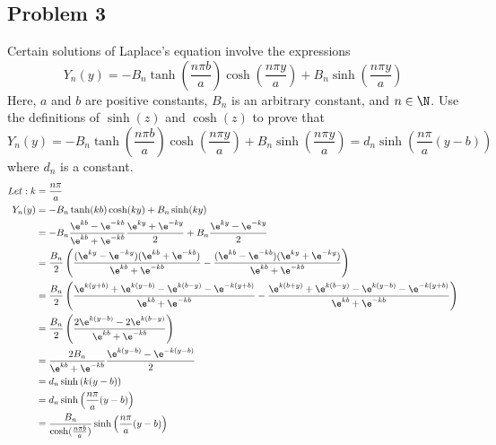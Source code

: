 \documentclass{math}
\begin{document}
\subsection*{Problem 3}
Certain solutions of Laplace's equation involve the expressions
\[ Y_n(y) = -B_n\tanh(\frac{n\pi b}{a})\cosh(\frac{n\pi y}{a})+
  B_n\sinh(\frac{n\pi y}{a}) \]
Here, \( a \) and \( b \) are positive constants, \( B_n \) is an arbitrary
constant, and \( n\in\N \). Use the definitions of \( \sinh(z) \) and
\( \cosh(z) \) to prove that
\[ Y_n(y) = -B_n\tanh(\frac{n\pi b}{a})\cosh(\frac{n\pi y}{a})+
  B_n\sinh(\frac{n\pi y}{a}) = d_n\sinh(\frac{n\pi}{a}(y-b)) \]
where \( d_n \) is a constant.
\begin{align*}
  Let: k &= \frac{n\pi}{a} \\
  Y_n(y) &= -B_n\tanh(kb)\cosh(ky)+B_n\sinh(ky) \\
  &= -B_n\frac{\e^{kb}-\e^{-kb}}{\e^{kb}+\e^{-kb}}\frac{\e^{ky}+\e^{-ky}}{2}+
    B_n\frac{\e^{ky}-\e^{-ky}}{2} \\
  &= \frac{B_n}{2}\left(
    \frac{(\e^{ky}-\e^{-ky})(\e^{kb}+\e^{-kb})}{\e^{kb}+\e^{-kb}}-
    \frac{(\e^{kb}-\e^{-kb})(\e^{ky}+\e^{-ky})}{\e^{kb}+\e^{-kb}}
    \right) \\
  &= \frac{B_n}{2}\left(
    \frac{\e^{k(y+b)}+\e^{k(y-b)}-\e^{k(b-y)}-\e^{-k(y+b)}}{\e^{kb}+\e^{-kb}}-
    \frac{\e^{k(b+y)}+\e^{k(b-y)}-\e^{k(y-b)}-\e^{-k(y+b)}}{\e^{kb}+\e^{-kb}}
  \right) \\
  &= \frac{B_n}{2}\left(
    \frac{2\e^{k(y-b)}-2\e^{k(b-y)}}{\e^{kb}+\e^{-kb}}
  \right) \\
  &= \frac{2B_n}{\e^{kb}+\e^{-kb}}\frac{\e^{k(y-b)}-\e^{-k(y-b)}}{2} \\
  &= d_n\sinh\left(k(y-b)\right) \\
  &= d_n\sinh\left(\frac{n\pi}{a}(y-b)\right) \\
  &= \frac{B_n}{\cosh(\frac{n\pi b}{a})}\sinh\left(\frac{n\pi}{a}(y-b)\right)
\end{align*}
\end{document}
